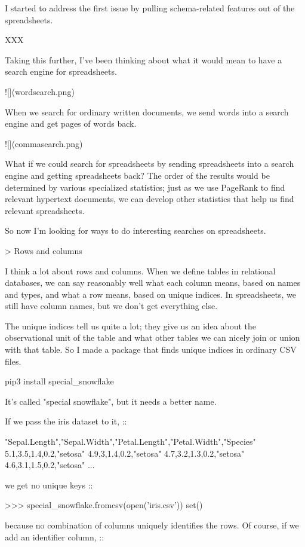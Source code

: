 \documentclass{acm_proc_article-sp}
\begin{document}
I started to address the first issue by pulling schema-related features out
of the spreadsheets.

XXX

Taking this further, I've been thinking
about what it would mean to have a search engine for spreadsheets.

![](wordsearch.png)

When we search for ordinary written documents, we send words into a search
engine and get pages of words back.

![](commasearch.png)

What if we could search for spreadsheets
by sending spreadsheets into a search engine and getting spreadsheets back?
The order of the results would be determined by various specialized statistics;
just as we use PageRank to find relevant hypertext documents, we can develop
other statistics that help us find relevant spreadsheets.

So now I'm looking for ways to do interesting searches on spreadsheets.

> Rows and columns

I think a lot about rows and columns. When we define tables in relational
databases, we can say reasonably well what each column means, based on
names and types, and what a row means, based on unique indices.
In spreadsheets, we still have column names, but we don't get everything
else.

The unique indices tell us quite a lot; they give us an idea about the
observational unit of the table and what other tables we can nicely
join or union with that table. So I made a package that finds unique
indices in ordinary CSV files.

    pip3 install special_snowflake

It's called "special snowflake", but it needs a better name.

If we pass the iris dataset to it, ::

    "Sepal.Length","Sepal.Width","Petal.Length","Petal.Width","Species"
    5.1,3.5,1.4,0.2,"setosa"
    4.9,3,1.4,0.2,"setosa"
    4.7,3.2,1.3,0.2,"setosa"
    4.6,3.1,1.5,0.2,"setosa"
    ...

we get no unique keys ::

    >>> special_snowflake.fromcsv(open('iris.csv'))                                                                  
    set()

because no combination of columns uniquely identifies the rows.
Of course, if we add an identifier column, ::
\end{document}
